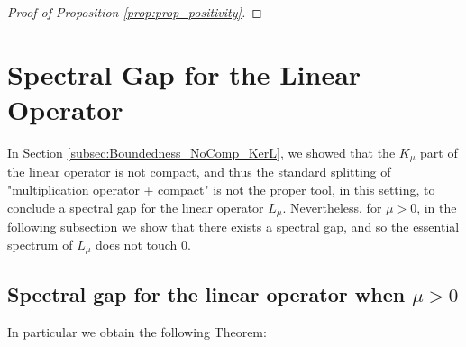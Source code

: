 \documentclass[reqno,11pt,letterpaper]{amsart}
\numberwithin{equation}{section}
\newcommand{\dd}{\, {\rm d}}
\begin{document}
\begin{proof}[Proof of Proposition \ref{prop:prop_positivity}]
\end{proof}

\section{Spectral Gap for the Linear Operator} \label{sec:SG}

In Section \ref{subsec:Boundedness_NoComp_KerL}, we showed that the $K_\mu$ part of the linear operator is not compact, and thus the standard splitting of "multiplication operator + compact" is not the proper tool, in this setting, to conclude a spectral gap for the linear operator $L_\mu$. Nevertheless, for $\mu>0$, in the following subsection we show that there exists a spectral gap, and so the essential spectrum of $L_\mu$ does not touch $0$.  

\subsection{Spectral gap for the linear operator when $\mu>0$}

In particular we obtain the following Theorem: 
 
\end{document}
